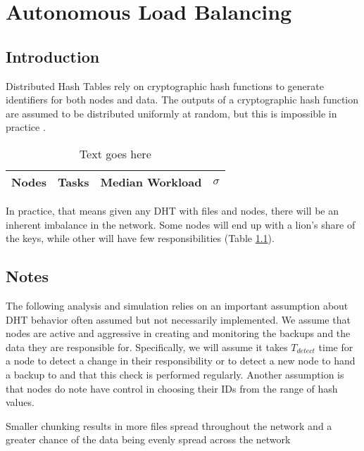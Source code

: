 \chapter{Autonomous Load Balancing}
\label{chapter:auto-balance}





\section{Introduction}
Distributed Hash Tables rely on cryptographic hash functions to generate identifiers for both nodes and data.
The outputs of a cryptographic hash function are assumed to be distributed uniformly at random, but this is impossible in practice \cite{hash-outputs} \cite{thomsen2005cryptographic}.


\begin{table}
	\centering
	\caption{Text goes here}
	\begin{tabular}{l l l l}
		Nodes & Tasks & Median Workload & $\sigma$ \\ \hline
	\end{tabular}
	\label{tab:medianLoads}
\end{table}


In practice, that means given any DHT with files and nodes, there will be an inherent imbalance in the network.
Some nodes will end up with a lion's share of the keys, while other will have few responsibilities (Table \ref{tab:medianLoads}).






\section{Notes}
The following analysis and simulation relies on an important assumption about DHT behavior often assumed but not necessarily implemented.
We assume that nodes are active and aggressive in creating and monitoring the backups and the data they are responsible for.
Specifically, we will assume  it takes  $T_{detect}$ time for a node to detect a change in their responsibility or to detect a new node to hand a backup to and that this check is performed regularly.
Another assumption is that nodes do note have control in choosing their IDs from the range of hash values.

Smaller chunking results in more files spread throughout the  network and a greater chance of the data being evenly spread across the network 

